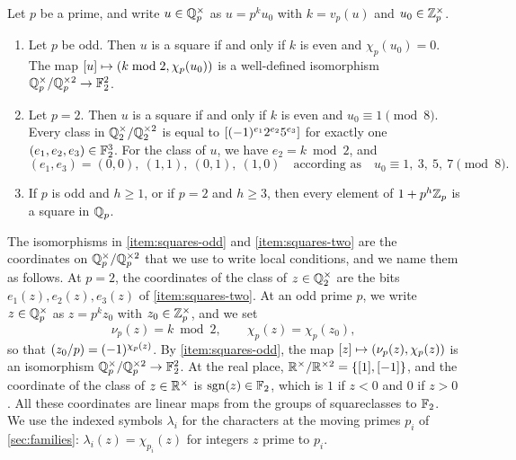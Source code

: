 \begin{lemma}[Squareclasses of $\Q_p$]\label{lem:squares}
Let $p$ be a prime, and write $u\in\mathbb Q_p^\times$ as $u=p^ku_0$ with $k=v_p(u)$ and $u_0\in\mathbb Z_p^\times$.
\begin{enumerate}[label=(\alph*),ref=(\alph*)]
\item\label{item:squares-odd} Let $p$ be odd. Then $u$ is a square if and only if $k$ is even and $\chi_p(u_0)=0$. The map $[u]\mapsto(k\bmod2,\chi_p(u_0))$ is a well-defined isomorphism $\mathbb Q_p^{\times}/\mathbb Q_p^{\times2}\to\mathbb F_2^2$.
\item\label{item:squares-two} Let $p=2$. Then $u$ is a square if and only if $k$ is even and $u_0\equiv1\pmod8$. Every class in $\mathbb Q_2^{\times}/\mathbb Q_2^{\times2}$ is equal to $[(-1)^{e_1}2^{e_2}5^{e_3}]$ for exactly one $(e_1,e_2,e_3)\in\mathbb F_2^3$. For the class of $u$, we have $e_2=k\bmod2$, and
\begin{equation}\label{eq:two-adic-coordinates}
(e_1,e_3)=(0,0),\ (1,1),\ (0,1),\ (1,0)\quad\text{according as}\quad u_0\equiv1,\ 3,\ 5,\ 7\pmod8.
\end{equation}
\item\label{item:squares-one} If $p$ is odd and $h\ge1$, or if $p=2$ and $h\ge3$, then every element of $1+p^h\mathbb Z_p$ is a square in $\Q_p$.
\end{enumerate}
\end{lemma}

The isomorphisms in \ref{item:squares-odd} and \ref{item:squares-two} are the coordinates on $\mathbb Q_p^{\times}/\mathbb Q_p^{\times2}$ that we use to write local conditions, and we name them as follows. At $p=2$, the coordinates of the class of $z\in\mathbb Q_2^\times$ are the bits $e_1(z),e_2(z),e_3(z)$ of \ref{item:squares-two}. At an odd prime $p$, we write $z\in\mathbb Q_p^\times$ as $z=p^kz_0$ with $z_0\in\mathbb Z_p^\times$, and we set
\begin{equation}\label{eq:odd-coordinates}
\nu_p(z)=k\bmod2,\qquad\chi_p(z)=\chi_p(z_0),
\end{equation}
so that $\leg{z_0}p=(-1)^{\chi_p(z)}$. By \ref{item:squares-odd}, the map $[z]\mapsto(\nu_p(z),\chi_p(z))$ is an isomorphism $\mathbb Q_p^{\times}/\mathbb Q_p^{\times2}\to\mathbb F_2^2$. At the real place, $\mathbb R^{\times}/\mathbb R^{\times2}=\{[1],[-1]\}$, and the coordinate of the class of $z\in\mathbb R^\times$ is $\mathrm{sgn}(z)\in\mathbb F_2$, which is $1$ if $z<0$ and $0$ if $z>0$. All these coordinates are linear maps from the groups of squareclasses to $\mathbb F_2$. We use the indexed symbols $\lambda_i$ for the characters at the moving primes $p_i$ of \cref{sec:families}: $\lambda_i(z)=\chi_{p_i}(z)$ for integers $z$ prime to $p_i$.


